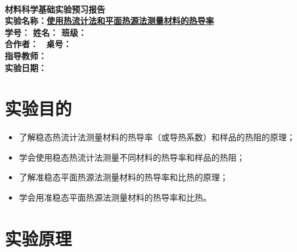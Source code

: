 \documentclass[a4paper,utf8]{article}
\begin{document}
\begin{center}
    {\mbox{}\\[7em]\bfseries\songti
    材料科学基础实验预习报告}\\[34mm]
    {\bfseries\songti
    实验名称：\uline{\hfill\mbox{使用热流计法和平面热源法测量材料的热导率}\hfill} \\[2.9mm]
    学\quad 号：\uline{}\hfill
    姓\quad 名：\uline{}\hfill
    班\quad 级：\uline{} \\[2.9mm]
    合作者：\uline{\makebox[25mm]{}}\enspace~
    桌\quad 号：\uline{\makebox[25mm]{}}\hfill\mbox{}\\[2.9mm]
    指导教师：\uline{}\hfill\mbox{} \\[2.9mm]
    实验日期：\uline{\makebox[30mm]{}}\hfill\mbox{} \\[58.7mm]
    }
\end{center}
\newpage
\section{实验目的}
    \begin{itemize}
        \item 了解稳态热流计法测量材料的热导率（或导热系数）和样品的热阻的原理；
        \item 学会使用稳态热流计法测量不同材料的热导率和样品的热阻；
        \item 了解准稳态平面热源法测量材料的热导率和比热的原理；
        \item 学会用准稳态平面热源法测量材料的热导率和比热。
    \end{itemize}
\section{实验原理}%
\end{document}
